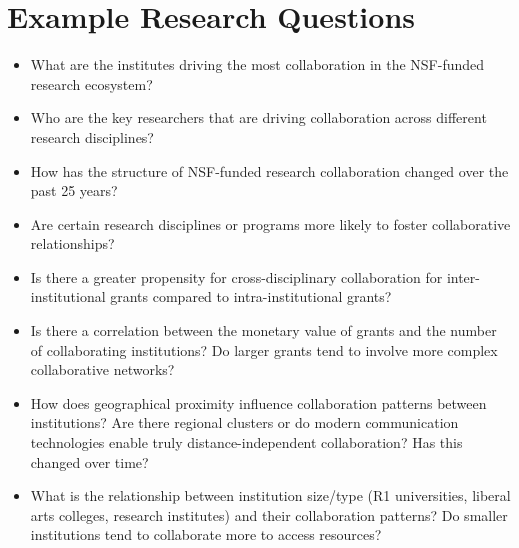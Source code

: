 \documentclass[10pt,twocolumn]{article}
\begin{document}
\section*{Example Research Questions}
\begin{itemize}
    \item What are the institutes driving the most collaboration in the NSF-funded research ecosystem?
    \item Who are the key researchers that are driving collaboration across different research disciplines?
    \item How has the structure of NSF-funded research collaboration changed over the past 25 years?
    \item Are certain research disciplines or programs more likely to foster collaborative relationships?
    \item Is there a greater propensity for cross-disciplinary collaboration for inter-institutional grants compared to intra-institutional grants?
    \item Is there a correlation between the monetary value of grants and the number of collaborating institutions? Do larger grants tend to involve more complex collaborative networks?
    \item How does geographical proximity influence collaboration patterns between institutions? Are there regional clusters or do modern communication technologies enable truly distance-independent collaboration? Has this changed over time?
    \item What is the relationship between institution size/type (R1 universities, liberal arts colleges, research institutes) and their collaboration patterns? Do smaller institutions tend to collaborate more to access resources?
\end{itemize}
\end{document}

